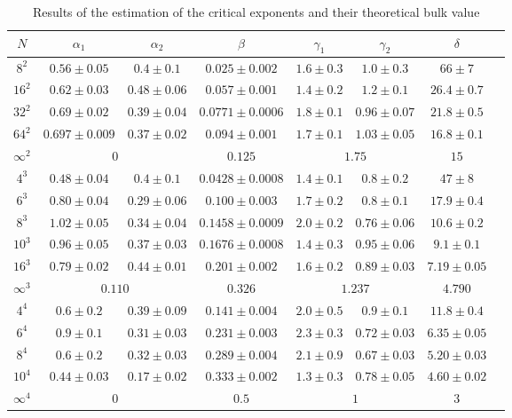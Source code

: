 \documentclass[a4paper, 11pt]{article}
\begin{document}
    \begin{table}
      \centering
      \begin{tabular}{c|ccccccc}
        \toprule
        $N$ & $\alpha_1$ & $\alpha_2$ & $\beta$ & $\gamma_1$ & $\gamma_2$ & $\delta$ \\
        \midrule
        $8^2$ & $0.56 \pm 0.05$ & $0.4 \pm 0.1$ & $0.025 \pm 0.002$ & $1.6 \pm 0.3$ & $1.0 \pm 0.3$ & $66 \pm 7$\\
        $16^2$ & $0.62 \pm 0.03$ & $0.48 \pm 0.06$ & $0.057 \pm 0.001$ & $1.4 \pm 0.2$ & $1.2 \pm 0.1$ & $26.4 \pm 0.7$\\
        $32^2$ & $0.69 \pm 0.02$ & $0.39 \pm 0.04$ & $0.0771 \pm 0.0006$ & $1.8 \pm 0.1$ & $0.96 \pm 0.07$ & $21.8 \pm 0.5$\\
        $64^2$ & $0.697 \pm 0.009$ & $0.37 \pm 0.02$ & $0.094 \pm 0.001$ & $1.7 \pm 0.1$ & $1.03 \pm 0.05$ & $16.8 \pm 0.1$\\
        $\infty^2$ & \multicolumn{2}{c}{$0$} & $0.125$ & \multicolumn{2}{c}{$1.75$} & $15$\\
        \midrule
        $4^3$ & $0.48 \pm 0.04$ & $0.4 \pm 0.1$ & $0.0428 \pm 0.0008$ & $1.4 \pm 0.1$ & $0.8 \pm 0.2$ & $47 \pm 8$\\
        $6^3$ & $0.80 \pm 0.04$ & $0.29 \pm 0.06$ & $0.100 \pm 0.003$ & $1.7 \pm 0.2$ & $0.8 \pm 0.1$ & $17.9 \pm 0.4$\\
        $8^3$ & $1.02 \pm 0.05$ & $0.34 \pm 0.04$ & $0.1458 \pm 0.0009$ & $2.0 \pm 0.2$ & $0.76 \pm 0.06$ & $10.6 \pm 0.2$\\
        $10^3$ & $0.96 \pm 0.05$ & $0.37 \pm 0.03$ & $0.1676 \pm 0.0008$ & $1.4 \pm 0.3$ & $0.95 \pm 0.06$ & $9.1 \pm 0.1$\\
        $16^3$ & $0.79 \pm 0.02$ & $0.44 \pm 0.01$ & $0.201 \pm 0.002$ & $1.6 \pm 0.2$ & $0.89 \pm 0.03$ & $7.19 \pm 0.05$\\
        $\infty^3$ & \multicolumn{2}{c}{$0.110$} & $0.326$ & \multicolumn{2}{c}{$1.237$} & $4.790$\\
        \midrule
        $4^4$ & $0.6 \pm 0.2$ & $0.39 \pm 0.09$ & $0.141 \pm 0.004$ & $2.0 \pm 0.5$ & $0.9 \pm 0.1$ & $11.8 \pm 0.4$\\
        $6^4$ & $0.9 \pm 0.1$ & $0.31 \pm 0.03$ & $0.231 \pm 0.003$ & $2.3 \pm 0.3$ & $0.72 \pm 0.03$ & $6.35 \pm 0.05$\\
        $8^4$ & $0.6 \pm 0.2$ & $0.32 \pm 0.03$ & $0.289 \pm 0.004$ & $2.1 \pm 0.9$ & $0.67 \pm 0.03$ & $5.20 \pm 0.03$\\
        $10^4$ & $0.44 \pm 0.03$ & $0.17 \pm 0.02$ & $0.333 \pm 0.002$ & $1.3 \pm 0.3$ & $0.78 \pm 0.05$ & $4.60 \pm 0.02$\\
        $\infty^4$ & \multicolumn{2}{c}{$0$} & $0.5$ & \multicolumn{2}{c}{$1$} & $3$\\
        \bottomrule
      \end{tabular}
      \caption{Results of the estimation of the critical exponents and their theoretical bulk value}
      \label{tab:exponents}
    \end{table}
\end{document}

